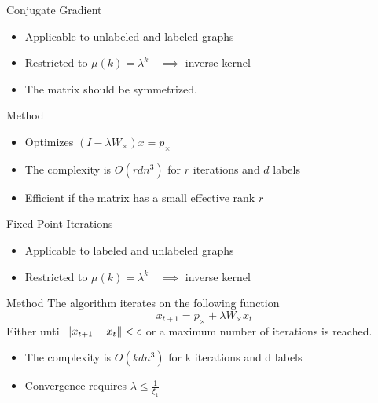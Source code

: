 \documentclass[compress]{beamer}
\DeclarePairedDelimiter{\norm}{\lVert}{\rVert}
\begin{document}
\begin{frame}{Conjugate Gradient}
	\begin{itemize}
		\item Applicable to unlabeled and labeled graphs
		\item Restricted to $\mu(k)=\lambda^k\quad\implies$ inverse kernel
		\item The matrix should be symmetrized.
	\end{itemize}
	\begin{block}{Method}
		\begin{itemize}
			\item Optimizes $(I-\lambda W_\times)x=p_\times$
		\end{itemize}
	\end{block}
\begin{itemize}
	\item The complexity is $O(rdn^3)$ for $r$ iterations and $d$ labels
	\item Efficient if the matrix has a small effective rank $r$
\end{itemize}
\end{frame}
\begin{frame}{Fixed Point Iterations}
\begin{itemize}
	\item Applicable to labeled and unlabeled graphs
	\item Restricted to $\mu(k)=\lambda^k\quad\implies$ inverse kernel
\end{itemize}
\begin{block}{Method}
The algorithm iterates on the following function
\begin{equation*}
x_{t+1} = p_\times + \lambda W_{\times}x_t
\end{equation*}
Either until $\norm{x_{t+1}-x_t}<\epsilon$ or a maximum number of iterations is reached.
\end{block}
\begin{itemize}
	\item The complexity is $O(kdn^3)$ for k iterations and d labels
	\item Convergence requires $\lambda \leq \frac{1}{\xi_1}$
\end{itemize}
\end{frame}
\end{document}
